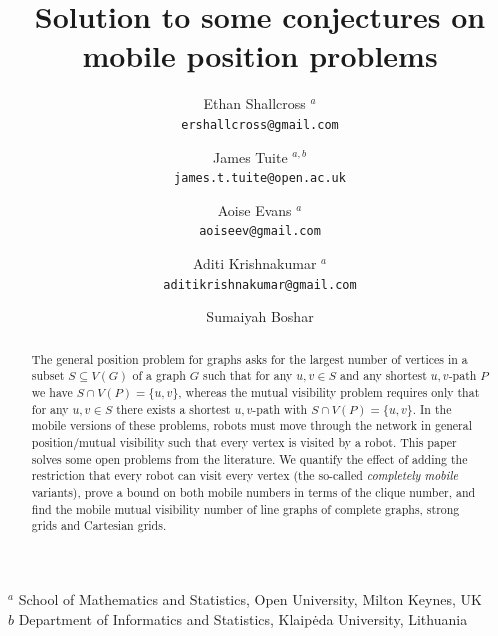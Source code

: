 \documentclass[a4paper,12pt]{article}
\theoremstyle{definition}
\newcommand{\address}[1]{#1}
\begin{document}
	
	\title{Solution to some conjectures on mobile position problems}
	
	\author{ Ethan Shallcross $^{a}$ \\ \texttt{\footnotesize ershallcross@gmail.com} \\
		\and
		James Tuite $^{a,b}$ \\ \texttt{\footnotesize james.t.tuite@open.ac.uk} \\
		\and Aoise Evans $^{a}$ \\ \texttt{\footnotesize aoiseev@gmail.com}
		\and
		Aditi Krishnakumar $^{a}$ \\ \texttt{\footnotesize aditikrishnakumar@gmail.com} \\  
		\and Sumaiyah Boshar   \\ \texttt{\footnotesize }    
	}
	
	\maketitle	
	
	\address{
		\noindent
		$^a$  School of Mathematics and Statistics, Open University, Milton Keynes, UK\\
		$b$ Department of Informatics and Statistics, Klaip\.{e}da University, Lithuania\\
		
	}
	
	
	
	
	
	
	
	\begin{abstract}
		The general position problem for graphs asks for the largest number of vertices in a subset $S \subseteq V(G)$ of a graph $G$ such that for any $u,v \in S$ and any shortest $u,v$-path $P$ we have $S \cap V(P) = \{ u,v\} $, whereas the mutual visibility problem requires only that for any $u,v \in S$ there exists a shortest $u,v$-path with $S \cap V(P) = \{ u,v\} $. In the mobile versions of these problems, robots must move through the network in general position/mutual visibility such that every vertex is visited by a robot. This paper solves some open problems from the literature. We quantify the effect of adding the restriction that every robot can visit every vertex (the so-called \emph{completely mobile} variants), prove a bound on both mobile numbers in terms of the clique number, and find the mobile mutual visibility number of line graphs of complete graphs, strong grids and Cartesian grids.
	\end{abstract}
	
\end{document}
